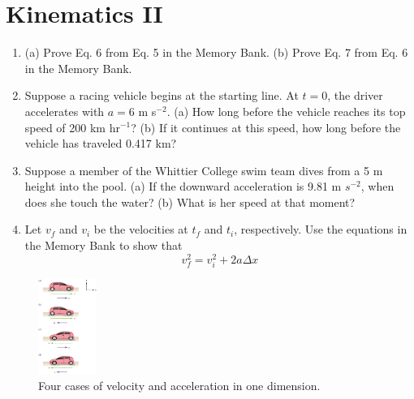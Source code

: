 \documentclass{article}
\begin{document}
\section{Kinematics II}

\begin{enumerate}
\item (a) Prove Eq. 6 from Eq. 5 in the Memory Bank. (b) Prove Eq. 7 from Eq. 6 in the Memory Bank. \\ \vspace{2cm}
\item Suppose a racing vehicle begins at the starting line.  At $t = 0$, the driver accelerates with $a=6$ m s$^{-2}$. (a) How long before the vehicle reaches its top speed of 200 km hr$^{-1}$? (b) If it continues at this speed, how long before the vehicle has traveled 0.417 km? \\ \vspace{3cm}
\item Suppose a member of the Whittier College swim team dives from a 5 m height into the pool.  (a) If the downward acceleration is 9.81 m $s^{-2}$, when does she touch the water? (b) What is her speed at that moment? \\ \vspace{2cm}
\item Let $v_f$ and $v_i$ be the velocities at $t_f$ and $t_i$, respectively.  Use the equations in the Memory Bank to show that
\begin{equation}
v_f^2 = v_i^2 + 2 a \Delta x
\end{equation}
\end{enumerate}

\begin{figure}
\centering
\includegraphics[width=0.17\textwidth,trim=0cm 0cm 1.75cm 0cm,clip=true]{figures/vehicle_v_a.jpeg}
\caption{\label{fig:vehicle_v_a} Four cases of velocity and acceleration in one dimension.}
\end{figure}
\end{document}
